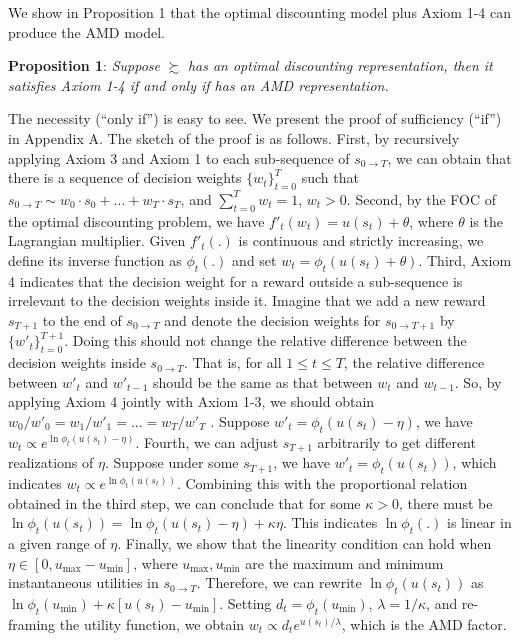 \documentclass[
  12pt,
]{article}
\begin{document}
We show in Proposition 1 that the optimal discounting model plus Axiom
1-4 can produce the AMD model.

\noindent \textbf{Proposition 1}: \emph{Suppose} \(\succsim\) \emph{has
an optimal discounting representation, then it satisfies Axiom 1-4 if
and only if has an AMD representation.}

The necessity (``only if'') is easy to see. We present the proof of
sufficiency (``if'') in Appendix A. The sketch of the proof is as
follows. First, by recursively applying Axiom 3 and Axiom 1 to each
sub-sequence of \(s_{0\rightarrow T}\), we can obtain that there is a
sequence of decision weights \(\{w_t\}_{t=0}^T\) such that
\(s_{0\rightarrow T}\sim w_0\cdot s_0+...+w_T\cdot s_T\), and
\(\sum_{t=0}^T w_t = 1\), \(w_t>0\). Second, by the FOC of the optimal
discounting problem, we have \(f'_t(w_t)=u(s_t)+\theta\), where
\(\theta\) is the Lagrangian multiplier. Given \(f'_t(.)\) is continuous
and strictly increasing, we define its inverse function as \(\phi_t(.)\)
and set \(w_t=\phi_t(u(s_t)+\theta)\). Third, Axiom 4 indicates that the
decision weight for a reward outside a sub-sequence is irrelevant to the
decision weights inside it. Imagine that we add a new reward \(s_{T+1}\)
to the end of \(s_{0\rightarrow T}\) and denote the decision weights for
\(s_{0\rightarrow T+1}\) by \(\{w'_t\}_{t=0}^{T+1}\). Doing this should
not change the relative difference between the decision weights inside
\(s_{0\rightarrow T}\). That is, for all \(1\leq t\leq T\), the relative
difference between \(w'_t\) and \(w'_{t-1}\) should be the same as that
between \(w_t\) and \(w_{t-1}\). So, by applying Axiom 4 jointly with
Axiom 1-3, we should obtain \(w_0/w'_0=w_1/w'_1=...=w_T/w'_T\) . Suppose
\(w'_t=\phi_t(u(s_t)-\eta)\), we have
\(w_t \propto e^{\ln\phi_t(u(s_t)-\eta)}\). Fourth, we can adjust
\(s_{T+1}\) arbitrarily to get different realizations of \(\eta\).
Suppose under some \(s_{T+1}\), we have \(w'_t = \phi_t(u(s_t))\), which
indicates \(w_t \propto e^{\ln\phi_t(u(s_t))}\). Combining this with the
proportional relation obtained in the third step, we can conclude that
for some \(\kappa>0\), there must be
\(\ln\phi_t(u(s_t))=\ln\phi_t(u(s_t)-\eta)+\kappa\eta\). This indicates
\(\ln \phi_t(.)\) is linear in a given range of \(\eta\). Finally, we
show that the linearity condition can hold when
\(\eta\in[0,u_{\max}-u_{\min}]\), where \(u_{\max},u_{\min}\) are the
maximum and minimum instantaneous utilities in \(s_{0\rightarrow T}\).
Therefore, we can rewrite \(\ln\phi_t(u(s_t))\) as
\(\ln\phi_t(u_{\min})+\kappa[u(s_t)-u_{\min}]\). Setting
\(d_t=\phi_t(u_{\min})\), \(\lambda =1/\kappa\), and re-framing the
utility function, we obtain \(w_t \propto d_t e^{u(s_t)/\lambda}\),
which is the AMD factor.
\end{document}
